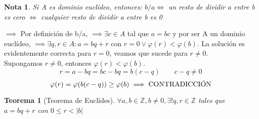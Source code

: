 \documentclass[11pt, a4paper, titlepage]{article}
\makeatletter
\renewenvironment{proof}[1][\proofname] {\vspace{-15pt}\par\pushQED{\qed}\normalfont\topsep6\p@\@plus6\p@\relax\trivlist\item[\hskip\labelsep\it#1\@addpunct{.}]\ignorespaces}{\popQED\endtrivlist\@endpefalse}
\providecommand{\ent}{\mathbb{Z}}
\theoremstyle{theorem-style}
\newtheorem*{nth}{Teorema}
\theoremstyle{definition-style}
\theoremstyle{remark-style}
\newtheorem*{nota}{Nota}
\theoremstyle{example-style}
\makeatother
\begin{document}
\begin{nota}
	Si A es dominio euclídeo, entonces: 
$b/a \iff$ un resto de dividir a entre b es cero $\iff$ cualquier resto de dividir a entre b es 0 
\end{nota}
\begin{proof}
	$\boxed{\implies}$ Por definición de b/a, $\implies \exists c \in A$ tal que $a=bc$ y por ser A un dominio euclídeo, $\implies \exists q,r \in 		A : 	a = bq + r $ con $r=0 \vee \varphi(r) < \varphi(b)$. La solución 	es evidentemente correcta para $r = 0$, veamos que sucede para $r \neq 	0$.
\\
Supongamos $r \neq 0$, entonces $\varphi(r) < \varphi(b)$. 
$$r = a - bq = bc - bq = b(c-q) \quad \quad c-q \neq 0$$
$$\varphi(r) = \varphi(b(c-q)) \ge \varphi(b) \implies \textup{CONTRADICCIÓN}$$  
\end{proof}

\begin{nth}[Teorema de Euclídes]

	$\forall a,b \in \ent, b \neq 0, \exists !q,r \in \ent$ tales que $a = bq + r $ con $0 \le r < |b|$
\end{nth}
\end{document}
